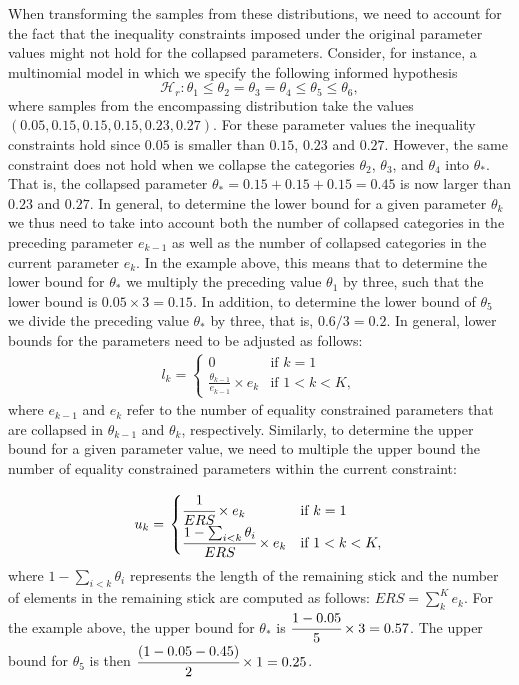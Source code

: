 \begin{appendix}
When transforming the samples from these distributions, we need to
account for the fact that the inequality constraints imposed under the
original parameter values might not hold for the collapsed parameters.
Consider, for instance, a multinomial model in which we specify the
following informed hypothesis
\[\mathcal{H}_r: \theta_1 \leq \theta_2 = \theta_3 = \theta_4 \leq \theta_5 \leq \theta_6,\]
where samples from the encompassing distribution take the values
\((0.05, 0.15, 0.15, 0.15, 0.23, 0.27)\). For these parameter values the
inequality constraints hold since \(0.05\) is smaller than \(0.15\),
\(0.23\) and \(0.27\). However, the same constraint does not hold when
we collapse the categories \(\theta_2\), \(\theta_3\), and \(\theta_4\)
into \(\theta_*\). That is, the collapsed parameter
\(\theta_* = 0.15 + 0.15 + 0.15 = 0.45\) is now larger than \(0.23\) and
\(0.27\). In general, to determine the lower bound for a given parameter
\(\theta_k\) we thus need to take into account both the number of
collapsed categories in the preceding parameter \(e_{k-1}\) as well as
the number of collapsed categories in the current parameter \(e_{k}\).
In the example above, this means that to determine the lower bound for
\(\theta_*\) we multiply the preceding value \(\theta_1\) by three, such
that the lower bound is \(0.05 \times 3 = 0.15\). In addition, to
determine the lower bound of \(\theta_5\) we divide the preceding value
\(\theta_*\) by three, that is, \(0.6/3 = 0.2\). In general, lower
bounds for the parameters need to be adjusted as follows: \begin{align}
  l_k = \left.
  \begin{cases}
      0 & \text{if } k = 1 \\
      \frac{\theta_{k - 1}}{e_{k-1}} \times e_k & \text{if } 1 < k < K,
  \end{cases}
    \right.
\end{align} where \(e_{k-1}\) and \(e_k\) refer to the number of
equality constrained parameters that are collapsed in \(\theta_{k - 1}\)
and \(\theta_{k}\), respectively. Similarly, to determine the upper
bound for a given parameter value, we need to multiple the upper bound
the number of equality constrained parameters within the current
constraint:

\begin{align}
  u_k = \left.
  \begin{cases}
      \cfrac{1}{ERS} \times e_k & \text{if } k = 1 \\
      \cfrac{1 - \sum_{i < k} \theta_i}{ERS} \times e_k & \text{if } 1 < k < K,
  \end{cases}
    \right.
\end{align} where \(1 - \sum_{i < k} \theta_i\) represents the length of
the remaining stick and the number of elements in the remaining stick
are computed as follows: \(ERS = \sum_k^{K} e_k\). For the example
above, the upper bound for \(\theta_*\) is
\(\cfrac{1 - 0.05}{5} \times 3 = 0.57\). The upper bound for
\(\theta_5\) is then \(\cfrac{(1 - 0.05 - 0.45)}{2} \times 1 = 0.25\).


\end{appendix}

